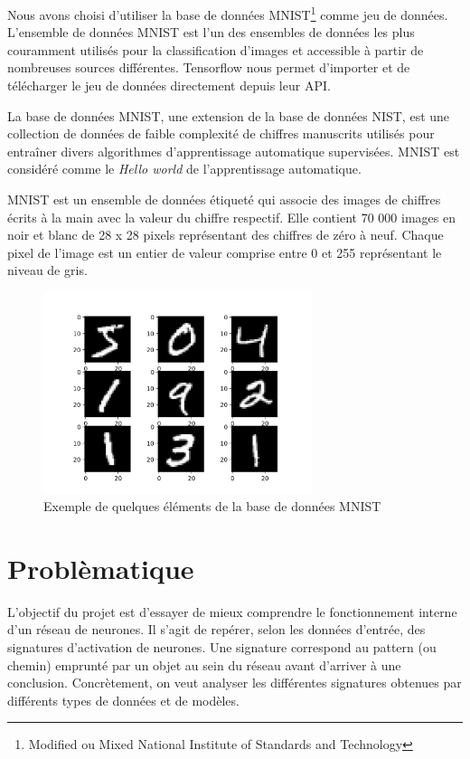 \documentclass[oneside,13pt,a4paper]{report}
\begin{document}
Nous avons choisi d'utiliser la base de données MNIST\footnote{Modified ou Mixed National Institute of Standards and Technology} comme jeu de données. L'ensemble de données MNIST est l'un des ensembles de données les plus couramment utilisés pour la classification d'images et accessible à partir de nombreuses sources différentes. Tensorflow nous permet d'importer et de télécharger le jeu de données directement depuis leur API.

La base de données MNIST, une extension de la base de données NIST, est une collection de données de faible complexité de chiffres manuscrits utilisés pour entraîner divers algorithmes d'apprentissage automatique supervisées. MNIST est considéré comme le \textit{Hello world} de l'apprentissage automatique.

MNIST est un ensemble de données étiqueté qui associe des images de chiffres écrits à la main avec la valeur du chiffre respectif. Elle contient 70 000 images en noir et blanc de 28 x 28 pixels représentant des chiffres de zéro à neuf. Chaque pixel de l'image est un entier de valeur comprise entre 0 et 255 représentant le niveau de gris.

\begin{figure}[!h]
	\begin{center}
		 \includegraphics[width=0.7\textwidth]{img/mnist.png}
		 \caption{Exemple de quelques éléments de la base de données MNIST}
	\end{center}
\end{figure}

\section{Problèmatique}
\label{prob}

L'objectif du projet est d'essayer de mieux comprendre le fonctionnement interne d'un réseau de neurones. Il s'agit de repérer, selon les données d'entrée, des signatures d'activation de neurones. Une signature correspond au pattern (ou chemin) emprunté par un objet au sein du réseau avant d'arriver à une conclusion. Concrètement, on veut analyser les différentes signatures obtenues par différents types de données et de modèles.
\end{document}
